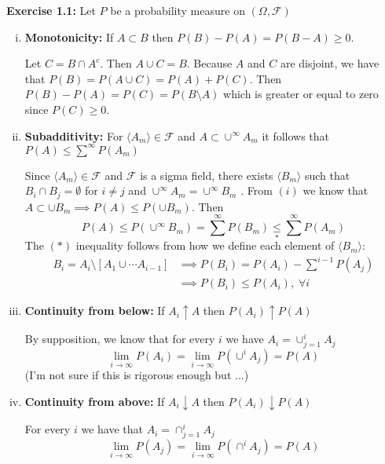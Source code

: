\textbf{Exercise 1.1:} Let $P$ be a probability measure on $(\Omega, \mathcal{F})$
\begin{enumerate}[i)]
    \item \textbf{Monotonicity:} If $A \subset B$ then $P(B) - P(A) = P(B-A) \geq 0$.
    \begin{mdframed}
        Let $C = B \cap A^c$. Then $A \cup C = B$. Because $A$ and $C$ are disjoint, we have that $P(B) = P(A \cup C) = P(A) + P(C)$. Then $P(B) - P(A) = P(C) = P(B \setminus A)$ which is greater or equal to zero since $P(C) \geq 0$.
    \end{mdframed}
    \item \textbf{Subadditivity:} For $\langle A_m \rangle \in \mathcal{F}$ and $A \subset \cup^\infty A_m$ it follows that $P(A) \leq \sum^\infty P(A_m)$
    \begin{mdframed}
        Since $\langle A_m \rangle \in \mathcal{F}$ and $\mathcal{F}$ is a sigma field, there exists $\langle B_m \rangle$ such that $B_i \cap B_j = \emptyset$ for $i \neq j$ and $\cup^\infty A_m = \cup^\infty B_m$ \cite[17--18]{royden2nd}. From $(i)$ we know that $A \subset \cup B_m \implies P(A) \leq P(\cup B_m)$. Then \[P(A) \leq P(\cup^\infty B_m) = \sum^\infty P(B_m) \underset{\ast}{\leq} \sum^\infty P(A_m)\] The $(\ast)$ inequality follows from how we define each element of $\langle B_m\rangle$:
        \begin{align*}
            B_i = A_i \setminus [A_1 \cup \cdots A_{i-1}] &\implies P(B_i) = P(A_i) - \sum^{i-1}P(A_j) \\
            &\implies P(B_i) \leq P(A_i), \; \forall i
        \end{align*}
    \end{mdframed}

    \item \textbf{Continuity from below:} If $A_i \uparrow A$ then $P(A_i) \uparrow P(A)$
    \begin{mdframed}
        By supposition, we know that for every $i$ we have $A_i = \cup^i_{j = 1} A_j$ 
        \[\lim_{i \to \infty} P(A_i)= \lim_{i \to \infty} P(\cup^i A_j) = P(A)\]
        (I'm not sure if this is rigorous enough but ...)
    \end{mdframed}
    \item \textbf{Continuity from above:} If $A_i \downarrow A$ then $P(A_i) \downarrow P(A)$
    \begin{mdframed}
        For every $i$ we have that $A_i = \cap_{j = 1}^i A_j$
        \[\lim_{i \to \infty} P(A_j)= \lim_{i \to \infty} P(\cap^i A_j ) = P(A)\] 
    \end{mdframed}
\end{enumerate} 

